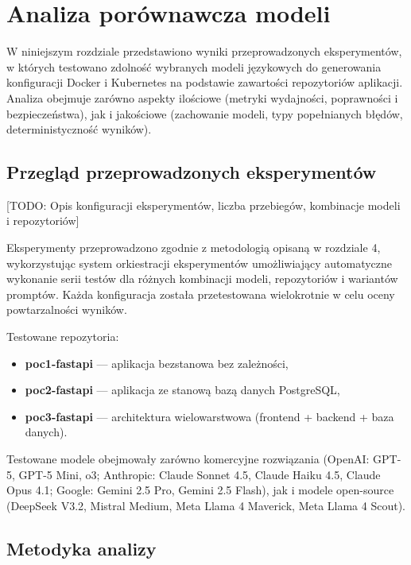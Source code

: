 \clearpage %
\section{Analiza porównawcza modeli}

W niniejszym rozdziale przedstawiono wyniki przeprowadzonych eksperymentów, w których testowano zdolność wybranych modeli językowych do generowania konfiguracji Docker i Kubernetes na podstawie zawartości repozytoriów aplikacji. Analiza obejmuje zarówno aspekty ilościowe (metryki wydajności, poprawności i bezpieczeństwa), jak i jakościowe (zachowanie modeli, typy popełnianych błędów, deterministyczność wyników).

\subsection{Przegląd przeprowadzonych eksperymentów}

[TODO: Opis konfiguracji eksperymentów, liczba przebiegów, kombinacje modeli i repozytoriów]

Eksperymenty przeprowadzono zgodnie z metodologią opisaną w rozdziale 4, wykorzystując system orkiestracji eksperymentów umożliwiający automatyczne wykonanie serii testów dla różnych kombinacji modeli, repozytoriów i wariantów promptów. Każda konfiguracja została przetestowana wielokrotnie w celu oceny powtarzalności wyników.

Testowane repozytoria:
\begin{itemize}
    \item \textbf{poc1-fastapi} — aplikacja bezstanowa bez zależności,
    \item \textbf{poc2-fastapi} — aplikacja ze stanową bazą danych PostgreSQL,
    \item \textbf{poc3-fastapi} — architektura wielowarstwowa (frontend + backend + baza danych).
\end{itemize}

Testowane modele obejmowały zarówno komercyjne rozwiązania (OpenAI: GPT-5, GPT-5 Mini, o3; Anthropic: Claude Sonnet 4.5, Claude Haiku 4.5, Claude Opus 4.1; Google: Gemini 2.5 Pro, Gemini 2.5 Flash), jak i modele open-source (DeepSeek V3.2, Mistral Medium, Meta Llama 4 Maverick, Meta Llama 4 Scout).

\subsection{Metodyka analizy}

